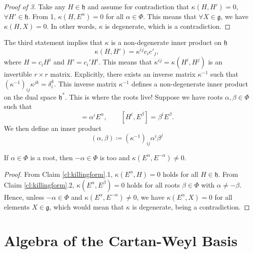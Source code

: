 \begin{proof}[Proof of 3]
  Take any $H \in \mathfrak{h}$ and assume for contradiction that $\kappa(H, H') = 0$, $\forall H' \in \mathfrak{h}$. From 1, $\kappa(H, E^{\alpha}) = 0$ for all $\alpha \in \Phi$. This means that $\forall X \in \mathfrak{g}$, we have $\kappa(H, X) = 0$. In other words, $\kappa$ is degenerate, which is a contradiction.
\end{proof}
The third statement implies that $\kappa$ is a non-degenerate inner product on $\mathfrak{h}$
\begin{equation}
  \kappa(H, H') = \kappa^{ij} c_{i} c'_{j},
\end{equation}
where $H = c_{i} H^{i}$ and $H' = c_{i}' H^{i}$.
This means that $\kappa^{ij} = \kappa(H^{i}, H^{j})$ is an invertible $r \times r$ matrix. Explicitly, there exists an inverse matrix $\kappa^{-1}$ such that $(\kappa^{-1})_{ij} \kappa^{jk} = \delta^{k}_{i}$.
This inverse matrix $\kappa^{-1}$ defines a non-degenerate inner product on the dual space $\mathfrak{h}^*$.
This is where the roots live! Suppose we have roots $\alpha, \beta \in \Phi$ such that
\begin{equation}
  [H^{i}, E^{\alpha}] = \alpha^{i} E^{\alpha}, \qquad [H^{i}, E^{\beta}] = \beta^{i} E^{\beta}.
\end{equation}
We then define an inner product
\begin{equation}
  \label{eq:16-6}
  \boxed{(\alpha, \beta) \coloneqq (\kappa^{-1})_{ij} \alpha^{i} \beta^{j}}
\end{equation}
\begin{claim} \label{claim:16-inverse-root-is-root}
  If $\alpha \in \Phi$ is a root, then $-\alpha \in \Phi$ is too and $\kappa(E^{\alpha}, E^{-\alpha}) \neq 0$.
\end{claim}
\begin{proof}
  From Claim \ref{cl:killingform}.1, $\kappa(E^{\alpha}, H) = 0$ holds for all $H \in \mathfrak{h}$.
  From Claim \ref{cl:killingform}.2, $\kappa(E^{\alpha}, E^{\beta}) = 0$ holds for all roots $\beta \in \Phi$ with $\alpha \neq -\beta$.
  Hence, unless $-\alpha \in \Phi$ and $\kappa(E^{\alpha}, E^{-\alpha}) \neq 0$, we have $\kappa(E^{\alpha}, X) = 0$ for all elements $X \in \mathfrak{g}$, which would mean that $\kappa$ is degenerate, being a contradiction.
\end{proof}

\section{Algebra of the Cartan-Weyl Basis}%
\label{sec:algebra_in_cartan_weyl_basis}

